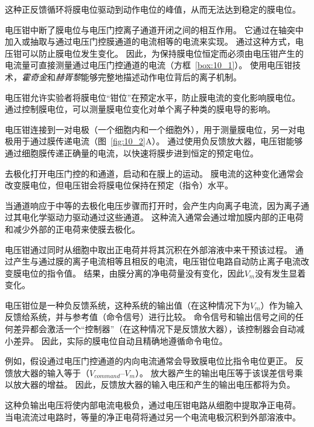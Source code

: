这种正反馈循环将膜电位驱动到动作电位的峰值，从而无法达到稳定的膜电位。


电压钳中断了膜电位与电压门控离子通道开闭之间的相互作用。
它通过在轴突中加入或抽取与通过电压门控膜通道的电流相等的电流来实现。
通过这种方式，电压钳可以防止膜电位发生变化。
因此，为保持膜电位恒定而必须由电压钳产生的电流量可直接测量通过电压门控通道的电流（方框~\ref{box:10_1}）。
使用电压钳技术，\textit{霍奇金}和\textit{赫胥黎}能够完整地描述动作电位背后的离子机制。


\begin{proposition}[电压钳技术] \label{box:10_1}
	
	\quad \quad 电压钳允许实验者将膜电位“钳位”在预定水平，防止膜电流的变化影响膜电位。
	通过控制膜电位，可以测量膜电位变化对单个离子种类的膜电导的影响。
	
	\quad \quad 电压钳连接到一对电极（一个细胞内和一个细胞外），用于测量膜电位，另一对电极用于通过膜传递电流（图~\ref{fig:10_2}A）。
	通过使用负反馈放大器，电压钳能够通过细胞膜传递正确量的电流，以快速将膜步进到恒定的预定电位。
	
	\quad \quad 去极化打开电压门控的和通道，启动和在膜上的运动。
	膜电流的这种变化通常会改变膜电位，但电压钳会将膜电位保持在预定（指令）水平。
	
	\quad \quad 当通道响应于中等的去极化电压步骤而打开时，会产生内向离子电流，因为离子通过其电化学驱动力驱动通过这些通道。
	这种流入通常会通过增加膜内部的正电荷和减少外部的正电荷来使膜去极化。
	
	\quad \quad 电压钳通过同时从细胞中取出正电荷并将其沉积在外部溶液中来干预该过程。
	通过产生与通过膜的离子电流相等且相反的电流，电压钳位电路自动防止离子电流改变膜电位的指令值。
	结果，由膜分离的净电荷量没有变化，因此$V_m$没有发生显着变化。
	
	\quad \quad 电压钳位是一种负反馈系统，这种系统的输出值（在这种情况下为$V_m$）作为输入反馈给系统，并与参考值（命令信号）进行比较。
	命令信号和输出信号之间的任何差异都会激活一个“控制器”（在这种情况下是反馈放大器），该控制器会自动减小差异。
	因此，实际的膜电位自动且精确地遵循命令电位。
	
	\quad \quad 例如，假设通过电压门控通道的内向电流通常会导致膜电位比指令电位更正。
	反馈放大器的输入等于（$V_{command}–V_m$）。
	放大器产生的输出电压等于该误差信号乘以放大器的增益。
	因此，反馈放大器的输入电压和产生的输出电压都将为负。
	
	\quad \quad 这种负输出电压将使内部电流电极负，通过电压钳电路从细胞中提取净正电荷。
	当电流流过电路时，等量的净正电荷将通过另一个电流电极沉积到外部溶液中。
	

\end{proposition}
